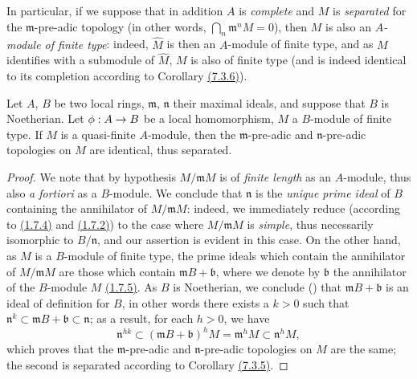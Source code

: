 In particular, if we suppose that in addition $A$ is {\em complete} and $M$ is
{\em separated} for the $\mathfrak{m}$-pre-adic topology (in other words,
$\bigcap_n\mathfrak{m}^n M=0$), then $M$ is also an {\em $A$-module of finite type}: indeed,
$\widehat{M}$ is then an $A$-module of finite type, and as $M$ identifies with a submodule of
$\widehat{M}$, $M$ is also of finite type (and is indeed identical to its completion
according to Corollary \hyperref[cor-0.7.3.6]{(7.3.6)}).

\begin{prop}[7.4.2]
\label{prop-0.7.4.2}
Let $A$, $B$ be two local rings, $\mathfrak{m}$, $\mathfrak{n}$ their maximal ideals, and
suppose that $B$ is Noetherian. Let $\phi:A\to B$ be a local homomorphism, $M$ a $B$-module
of finite type. If $M$ is a quasi-finite $A$-module, then the $\mathfrak{m}$-pre-adic and
$\mathfrak{n}$-pre-adic topologies on $M$ are identical, thus separated.
\end{prop}

\begin{proof}
\label{proof-prop-0.7.4.2}
We note that by hypothesis $M/\mathfrak{m}M$ is of {\em finite length} as an $A$-module,
thus also {\em a fortiori} as a $B$-module. We conclude that $\mathfrak{n}$ is the
{\em unique prime ideal} of $B$ containing the annihilator of $M/\mathfrak{m}M$: indeed, we
immediately reduce (according to \hyperref[env-0.1.7.4]{(1.7.4)} and
\hyperref[env-0.1.7.2]{(1.7.2)}) to the case where $M/\mathfrak{m}M$ is {\em simple}, thus
necessarily isomorphic to $B/\mathfrak{n}$, and our assertion is evident in this case. On
the other hand, as $M$ is a $B$-module of finite type, the prime ideals which contain the
annihilator of $M/\mathfrak{m}M$ are those which contain $\mathfrak{m}B+\mathfrak{b}$, where
we denote by $\mathfrak{b}$ the annihilator of the $B$-module $M$
\hyperref[env-0.1.7.5]{(1.7.5)}. As $B$ is Noetherian, we conclude
(\cite[p.~127, Cor.~4]{I-11}) that $\mathfrak{m}B+\mathfrak{b}$ is an ideal
of definition for $B$, in other words there exists a $k>0$ such that
$\mathfrak{n}^k\subset\mathfrak{m}B+\mathfrak{b}\subset\mathfrak{n}$; as a result, for each
$h>0$, we have
\[
  \mathfrak{n}^{hk}\subset(\mathfrak{m}B+\mathfrak{b})^h M
  =\mathfrak{m}^h M\subset\mathfrak{n}^h M,
\]
which proves that the $\mathfrak{m}$-pre-adic and $\mathfrak{n}$-pre-adic topologies on $M$
are the same; the second is separated according to Corollary \hyperref[cor-0.7.3.5]{(7.3.5)}.
\end{proof}

